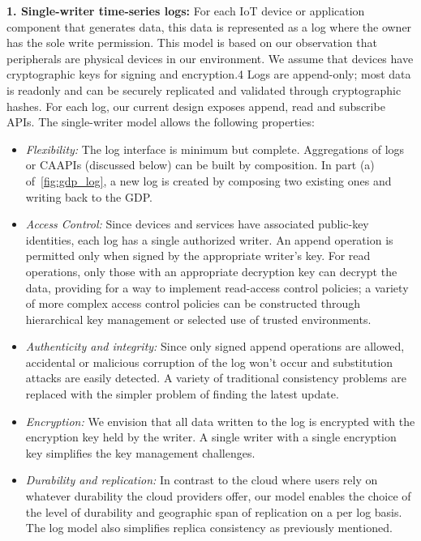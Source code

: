 \textbf{1. Single-writer time-series logs:} For each IoT device
or application component that generates data, this data is
represented as a log where the owner has the sole write
permission. This model is based on our observation that
peripherals are physical devices in our environment. We
assume that devices have cryptographic keys for signing
and encryption.4 Logs are append-only; most data is readonly
and can be securely replicated and validated through
cryptographic hashes.
For each log, our current design exposes append, read
and subscribe APIs. The single-writer model allows the
following properties:

\begin{itemize}
\item \textit{Flexibility:} The log interface is minimum but complete.
Aggregations of logs or CAAPIs (discussed below) can
be built by composition. In part (a) of~\autoref{fig:gdp_log}, a new log
is created by composing two existing ones and writing
back to the GDP.
\item \textit{Access Control:} Since devices and services have associated
public-key identities, each log has a single authorized
writer. An append operation is permitted only
when signed by the appropriate writer’s key. For read
operations, only those with an appropriate decryption key can decrypt the data, providing for a way to implement
read-access control policies; a variety of more
complex access control policies can be constructed
through hierarchical key management or selected use
of trusted environments.
\item \textit{Authenticity and integrity:} Since only signed append
operations are allowed, accidental or malicious corruption
of the log won’t occur and substitution attacks are
easily detected. A variety of traditional consistency
problems are replaced with the simpler problem of
finding the latest update.
\item \textit{Encryption:} We envision that all data written to the log
is encrypted with the encryption key held by the writer.
A single writer with a single encryption key simplifies
the key management challenges.
\item \textit{Durability and replication:} In contrast to the cloud
where users rely on whatever durability the cloud
providers offer, our model enables the choice of the
level of durability and geographic span of replication
on a per log basis. The log model also simplifies
replica consistency as previously mentioned.
\end{itemize}

